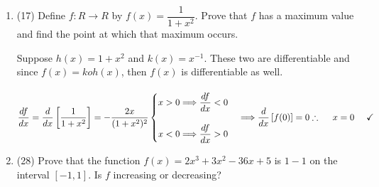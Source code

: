 \documentclass[fleqn]{article}
\begin{document}
\begin{enumerate}
    \item (17) Define $f: R \longrightarrow R$ by $f(x)=\dfrac{1}{1+x^2}$. Prove that $f$ has a maximum value and find the
    point at which that maximum occurs.

      \textcolor{hwColor}{
        Suppose $h(x)=1+x^2$ and $k(x)=x^{-1}$. These two are differentiable and since $f(x)=koh(x)$, then $f(x)$ is differentiable as well.
        \\
        \\
        $
          \dfrac{df}{dx}=\dfrac{d}{dx} \left[\dfrac{1}{1+x^2}\right]=-\dfrac{2x}{(1+x^2)^2}
          \\
          \\
          \\
          \begin{cases}
            x>0 \Longrightarrow \dfrac{df}{dx} <0
            \\
            \\
            x<0 \Longrightarrow \dfrac{df}{dx} >0
          \end{cases} \Longrightarrow \dfrac{d}{dx} \left[f(0)\right]=0
          \\
          \\
          \\
          \therefore ~~~~ x=0 ~~~~ \checkmark
        $
      }

    \item (28) Prove that the function $f(x)=2x^3+3x^2-36x+5$ is $1-1$ on the interval $[-1,1]$. Is $f$ increasing or decreasing?


\end{enumerate}
\end{document}
